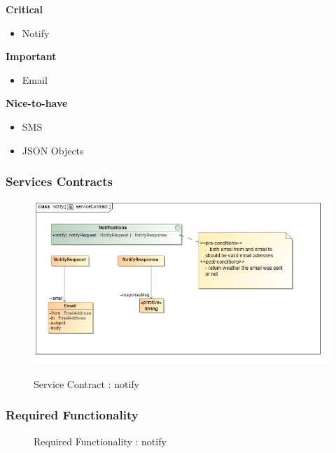 \documentclass{article}
\begin{document}
		\begin{flushleft}
			\textbf{Critical}
				\begin{itemize}
					\item Notify
				\end{itemize}
			\textbf{Important}
				\begin{itemize}
					\item Email
				\end{itemize}
			\textbf{Nice-to-have}
				\begin{itemize}
					\item SMS
					\item JSON Objects
				\end{itemize}
		\end{flushleft}

		\subsubsection{Services Contracts}

		\begin{figure}[H]
		\includegraphics[width=\textwidth]{images/class__notify__serviceContract.jpg}  \\
		\caption{Service Contract : notify}
		\end{figure}

		\subsubsection{Required Functionality}

		\begin{figure}[H]
		\caption{Required Functionality : notify}
		\end{figure}
\end{document}
